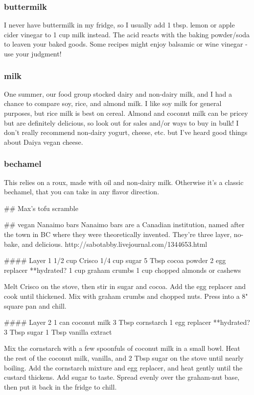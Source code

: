 \subsubsection{buttermilk}
I never have buttermilk in my fridge, so I usually add 1 tbsp. lemon or apple cider vinegar to 1 cup milk instead. The acid reacts with the baking powder/soda to leaven your baked goods. Some recipes might enjoy balsamic or wine vinegar - use your judgment!

\subsubsection{milk}
One summer, our food group stocked dairy and non-dairy milk, and I had a chance to compare soy, rice, and almond milk. I like soy milk for general purposes, but rice milk is best on cereal. Almond and coconut milk can be pricey but are definitely delicious, so look out for sales and/or ways to buy in bulk! I don't really recommend non-dairy yogurt, cheese, etc. but I've heard good things about Daiya vegan cheese.

\subsubsection{bechamel}
This relies on a roux, made with oil and non-dairy milk. Otherwise it's a classic bechamel, that you can take in any flavor direction.

## Max's tofu scramble

## vegan Nanaimo bars
Nanaimo bars are a Canadian institution, named after the town in BC where they were theoretically invented. They're three layer, no-bake, and delicious.
http://sabotabby.livejournal.com/1344653.html

#### Layer 1
1/2 cup Crisco
1/4 cup sugar
5 Tbsp cocoa powder
2 egg replacer **hydrated?
1 cup graham crumbs
1 cup chopped almonds or cashews

Melt Crisco on the stove, then stir in sugar and cocoa. Add the egg replacer and cook until thickened. Mix with graham crumbs and chopped nuts. Press into a 8" square pan and chill.

#### Layer 2
1 can coconut milk
3 Tbsp cornstarch
1 egg replacer **hydrated?
3 Tbsp sugar
1 Tbsp vanilla extract

Mix the cornstarch with a few spoonfuls of coconut milk in a small bowl. Heat the rest of the coconut milk, vanilla, and 2 Tbsp sugar on the stove until nearly boiling. Add the cornstarch mixture and egg replacer, and heat gently until the custard thickens. Add sugar to taste. Spread evenly over the graham-nut base, then put it back in the fridge to chill.

